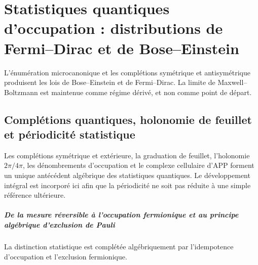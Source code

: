 \chapter{Statistiques quantiques d’occupation : distributions de Fermi–Dirac et de Bose–Einstein}
\label{chap:parte-iv-55}

L’énumération microcanonique et les complétions symétrique et antisymétrique produisent les lois de Bose--Einstein et de Fermi--Dirac. La limite de Maxwell--Boltzmann est maintenue comme régime dérivé, et non comme point de départ.



\section{Complétions quantiques, holonomie de feuillet et périodicité statistique}

Les complétions symétrique et extérieure, la graduation de feuillet, l’holonomie \(2\pi/4\pi\), les dénombrements d’occupation et le complexe cellulaire d’APP forment un unique antécédent algébrique des statistiques quantiques. Le développement intégral est incorporé ici afin que la périodicité ne soit pas réduite à une simple référence ultérieure.

\begingroup
\let\chapter\section
\let\section\subsection
\let\subsection\subsubsection
\let\subsubsection\paragraph
\let\clearpage\relax
\let\cleardoublepage\relax

\endgroup

\paragraph{De la mesure réversible à l’occupation fermionique et au principe algébrique d’exclusion de Pauli} La distinction statistique est complétée algébriquement par l’idempotence d’occupation et l’exclusion fermionique.
